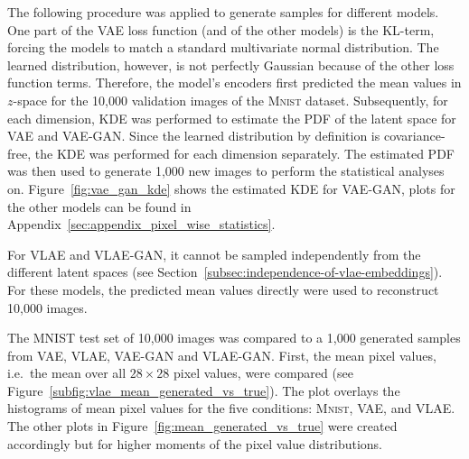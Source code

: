 The following procedure was applied to generate samples for different models.
One part of the \ac{VAE} loss function (and of the other models) is the \ac{KL}-term, forcing the models to match a standard multivariate normal distribution.
The learned distribution, however, is not perfectly Gaussian because of the other loss function terms.
Therefore, the model's encoders first predicted the mean values in $z$-space for the 10,000 validation images of the \textsc{Mnist} dataset.
Subsequently, for each dimension, \ac{KDE} was performed to estimate the \ac{PDF} of the latent space for \ac{VAE} and \ac{VAE}-\ac{GAN}.
Since the learned distribution by definition is covariance-free, the \ac{KDE} was performed for each dimension separately.
The estimated \ac{PDF} was then used to generate 1,000 new images to perform the statistical analyses on.
Figure~\ref{fig:vae_gan_kde} shows the estimated \ac{KDE} for \ac{VAE}-\ac{GAN}, plots for the other models can be found in Appendix~\ref{sec:appendix_pixel_wise_statistics}.

For \ac{VLAE} and \ac{VLAE}-\ac{GAN}, it cannot be sampled independently from the different latent spaces (see Section~\ref{subsec:independence-of-vlae-embeddings}).
For these models, the predicted mean values directly were used to reconstruct 10,000 images.

The MNIST test set of 10,000 images was compared to a 1,000 generated samples from \ac{VAE}, \ac{VLAE}, \ac{VAE}-\ac{GAN} and \ac{VLAE}-\ac{GAN}.
First, the mean pixel values, i.e.~the mean over all $28\times 28$ pixel values, were compared (see Figure~\ref{subfig:vlae_mean_generated_vs_true}).
The plot overlays the histograms of mean pixel values for the five conditions: \textsc{Mnist}, \ac{VAE}, and \ac{VLAE}.
The other plots in Figure~\ref{fig:mean_generated_vs_true} were created accordingly but for higher moments of the pixel value distributions.

